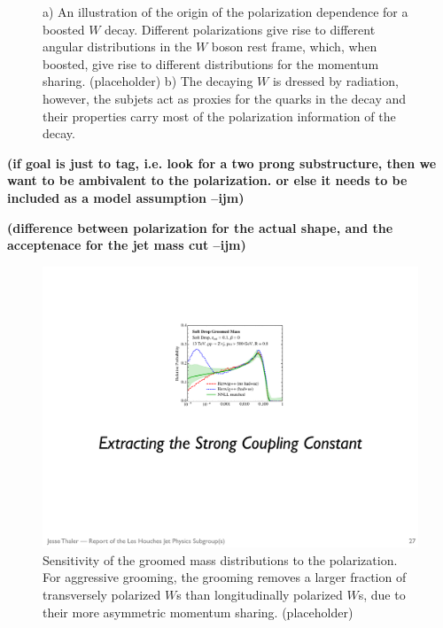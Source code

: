 \documentclass[11pt,letterpaper]{article}
\newcommand{\ijm}[1]{\textbf{\textcolor{llblue}{(#1 --ijm)}}}
\begin{document}
\begin{figure}
\begin{center}
\qquad
{}
\end{center}
\caption{a) An illustration of the origin of the polarization dependence for a boosted $W$ decay. Different polarizations give rise to different angular distributions in the $W$ boson rest frame, which, when boosted, give rise to different distributions for the momentum sharing. (placeholder) b) The decaying $W$ is dressed by radiation, however, the subjets act as proxies for the quarks in the decay and their properties carry most of the polarization information of the decay.
}
\label{fig:spin_boost}
\end{figure}






\ijm{if goal is just to tag, i.e. look for a two prong substructure, then we want to be ambivalent to the polarization. or else it needs to be included as a model assumption}

\ijm{difference between polarization for the actual shape, and the acceptenace for the jet mass cut}


\begin{figure}
\begin{center}
\includegraphics[width=0.4\columnwidth]{figures/mass_placeholder}
\end{center}
\caption{Sensitivity of the groomed mass distributions to the polarization. For aggressive grooming, the grooming removes a larger fraction of transversely polarized $W$s than longitudinally polarized $W$s, due to their more asymmetric momentum sharing. (placeholder)}
\end{figure}
\end{document}
